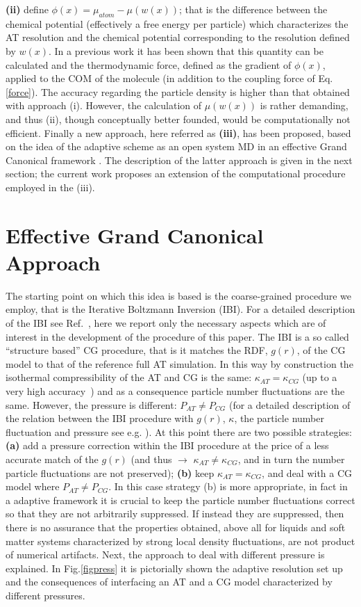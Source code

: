 \documentclass[aps,prb,preprint,citeautoscript]{revtex4}
\newcommand{\redc}[1]{{\color{black} #1}}
\begin{document}
{\bf (ii)} define $\phi(x)=\mu_{atom}-{\mu}{(w(x))}$; that is the difference between the chemical potential (effectively a free energy per particle) which characterizes the AT resolution and the chemical potential corresponding to the resolution defined by $w(x)$. In a previous work \cite{simon} it has been shown that this quantity can be calculated and the thermodynamic force, defined as the gradient of $\phi(x)$, applied to the COM of the molecule (in addition to the coupling force of Eq.\ref{force}). The accuracy regarding the particle density is higher than that obtained with approach (i). However, the calculation of $\mu(w(x))$ is rather demanding, and thus (ii), though conceptually better founded, would be computationally not efficient. Finally a new approach, here referred as {\bf (iii)}, has been proposed, based on the idea of the adaptive scheme as an open system MD in an effective Grand Canonical framework \cite{prlgc}. The description of the latter approach is given in the next section; the current work proposes an extension of the computational procedure employed in the (iii).

\section{Effective Grand Canonical Approach}
The starting point on which this idea is based is the coarse-grained procedure we employ, that is the Iterative Boltzmann Inversion  (IBI). 
For a detailed description of the IBI see Ref.~\cite{ibm}, here we report only the necessary aspects which are of interest in the development of the procedure of this paper.
The IBI is a so called ``structure based'' CG procedure, that is it matches the RDF, $g(r)$, of the CG model to that of the reference full AT simulation. In this way by construction the isothermal compressibility of the AT and CG is the same: $\kappa_{AT}=\kappa_{CG}$ \redc{(up to a very high accuracy}~\cite{han}) and as a consequence particle number fluctuations are the same. However, the pressure is different: $P_{AT}\neq P_{CG}$  (for a detailed description of the relation between the IBI procedure with $g(r)$, $\kappa$, the particle number fluctuation and pressure see e.g. \cite{han}). At this point there are two possible strategies: {\bf (a)}  add a pressure correction within the IBI procedure at the price of a less accurate match of the $g(r)$ (and thus $\rightarrow$ $\kappa_{AT}\neq\kappa_{CG}$, and in turn the number particle fluctuations are not preserved); {\bf (b)} keep $\kappa_{AT}=\kappa_{CG}$, and deal with a CG model where $P_{AT}\neq P_{CG}$. In this case strategy (b) is more appropriate, in fact in a adaptive framework it is crucial to keep the particle number fluctuations correct so that they are not arbitrarily suppressed. If instead they are suppressed, then there is no assurance that the properties obtained, above all for liquids and soft matter systems characterized by strong local density fluctuations, are not product of numerical artifacts. Next, the approach to deal with different pressure is explained. In Fig.\ref{figpress} it is pictorially shown the adaptive resolution set up and the consequences of interfacing an AT and a CG model characterized by different pressures. 
\end{document}
